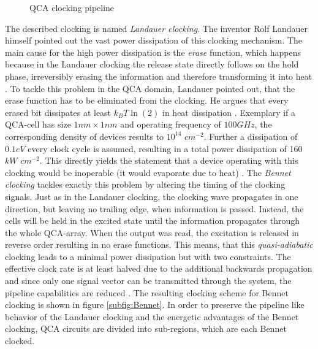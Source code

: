 
\begin{figure}
	\centering
	\caption{QCA clocking pipeline} \label{fig:QCAClockpipeline}
\end{figure}


The described clocking is named \textit{Landauer clocking}. The inventor Rolf Landauer himself pointed out the vast power dissipation of this clocking mechanism. The main cause for the high power dissipation is the \textit{erase} function, which happens because in the Landauer clocking the release state directly follows on the hold phase, irreversibly erasing the information and therefore transforming it into heat \cite{landauer1961irreversibility}. To tackle this problem in the QCA domain, Landauer pointed out, that the erase function has to be eliminated from the clocking. He argues that every erased bit dissipates at least $k_BT\ln(2)$ in heat dissipation \cite{keyes1970minimal}. Exemplary if a QCA-cell has size $1nm \times 1nm$ and operating frequency of $100 GHz$, the corresponding density of devices results to $10^{14}$ $cm^{-2}$. Further a dissipation of $0.1 eV$ every clock cycle is assumed, resulting in a total power dissipation of 160 $kW$ $cm^{-2}$. This directly yields the statement that a device operating with this clocking would be inoperable (it would evaporate due to heat) \cite{lent2006bennett}. The \textit{Bennet clocking} tackles exactly this problem by altering the timing of the clocking signals. Just as in the Landauer clocking, the clocking wave propagates in one direction, but leaving no trailing edge, when information is passed. Instead, the cells will be held in the excited state until the information propagates through the whole QCA-array. When the output was read, the excitation is released in reverse order resulting in no erase functions. This means, that this \textit{quasi-adiabatic} clocking leads to a minimal power dissipation but with two constraints. The effective clock rate is at least halved due to the additional backwards propagation and since only one signal vector can be transmitted through the system, the pipeline capabilities are reduced \cite{lent2006bennett}. The resulting clocking scheme for Bennet clocking is shown in figure \ref{subfig:Bennet}. In order to preserve the pipeline like behavior of the Landauer clocking and the energetic advantages of the Bennet clocking, QCA circuits are divided into sub-regions, which are each Bennet clocked.

